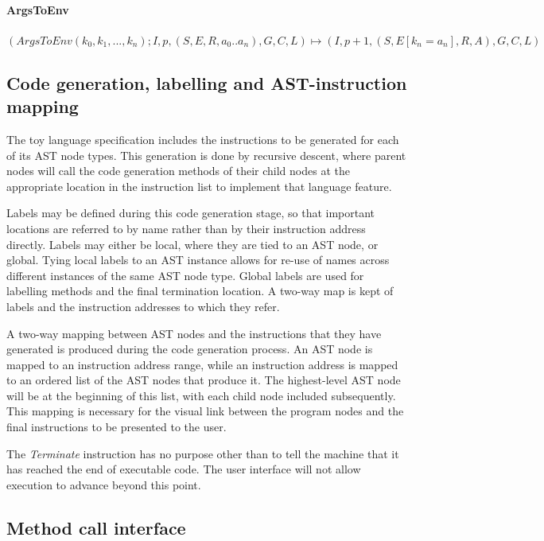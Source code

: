 \paragraph{ArgsToEnv}

$(ArgsToEnv (k_0, k_1, ..., k_n); I, p, (S, E, R, a_0..a_n), G, C, L) \mapsto (I, p+1, (S, E[k_n = a_n], R, A), G, C, L)$

\subsection{Code generation, labelling and AST-instruction mapping}

The toy language specification includes the instructions to be generated for each of its AST node types. This generation is done by recursive descent, where parent nodes will call the code generation methods of their child nodes at the appropriate location in the instruction list to implement that language feature.

Labels may be defined during this code generation stage, so that important locations are referred to by name rather than by their instruction address directly. Labels may either be local, where they are tied to an AST node, or global. Tying local labels to an AST instance allows for re-use of names across different instances of the same AST node type. Global labels are used for labelling methods and the final termination location. A two-way map is kept of labels and the instruction addresses to which they refer. 

A two-way mapping between AST nodes and the instructions that they have generated is produced during the code generation process. An AST node is mapped to an instruction address range, while an instruction address is mapped to an ordered list of the AST nodes that produce it. The highest-level AST node will be at the beginning of this list, with each child node included subsequently. This mapping is necessary for the visual link between the program nodes and the final instructions to be presented to the user.

The \textit{Terminate} instruction has no purpose other than to tell the machine that it has reached the end of executable code. The user interface will not allow execution to advance beyond this point. 

\subsection{Method call interface}

